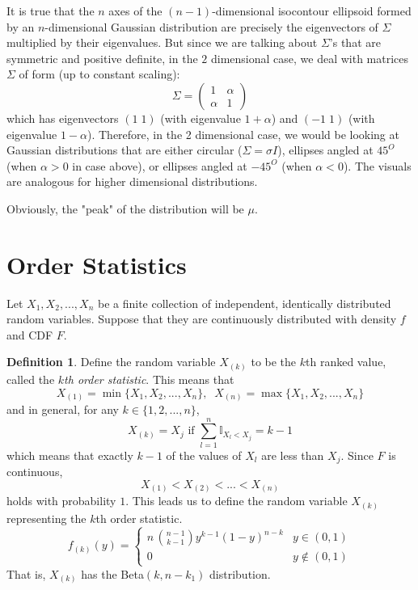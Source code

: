 \documentclass{article}
\theoremstyle{remark}
\theoremstyle{definition}
\newtheorem{definition}{Definition}[section]
\begin{document}
It is true that the $n$ axes of the $(n-1)$-dimensional isocontour ellipsoid formed by an $n$-dimensional Gaussian distribution are precisely the eigenvectors of $\Sigma$ multiplied by their eigenvalues. But since we are talking about $\Sigma$'s that are symmetric and positive definite, in the $2$ dimensional case, we deal with matrices $\Sigma$ of form (up to constant scaling): 
\[\Sigma = \begin{pmatrix}
1 & \alpha \\ \alpha & 1
\end{pmatrix}\]
which has eigenvectors $(1\; 1)$ (with eigenvalue $1+\alpha$) and $(-1\;1)$ (with eigenvalue $1-\alpha$). Therefore, in the 2 dimensional case, we would be looking at Gaussian distributions that are either circular ($\Sigma = \sigma I$), ellipses angled at $45^O$ (when $\alpha > 0$ in case above), or ellipses angled at $-45^O$ (when $\alpha < 0$). The visuals are analogous for higher dimensional distributions. 

Obviously, the "peak" of the distribution will be $\mu$. 

\section{Order Statistics}
Let $X_1, X_2, ..., X_n$ be a finite collection of independent, identically distributed random variables. Suppose that they are continuously distributed with density $f$ and CDF $F$. 

\begin{definition}
Define the random variable $X_{(k)}$ to be the $k$th ranked value, called the \textit{$k$th order statistic}. This means that 
\[X_{(1)} = \min\{X_1, X_2, ..., X_n\}, \;\; X_{(n)} = \max\{X_1, X_2, ..., X_n\}\]
and in general, for any $k \in \{1, 2, ..., n\}$, 
\[X_{(k)} = X_j \text{ if } \sum_{l=1}^n \mathbb{I}_{X_l < X_j} = k - 1\]
which means that exactly $k-1$ of the values of $X_l$ are less than $X_j$. Since $F$ is continuous, 
\[X_{(1)} < X_{(2)} < ... < X_{(n)}\]
holds with probability $1$. This leads us to define the random variable $X_{(k)}$ representing the $k$th order statistic.
\[f_{(k)} (y) = \begin{cases} 
n \, {{n-1} \choose {k-1}} y^{k-1} (1-y)^{n-k} & y \in (0, 1) \\
0 & y \not\in (0,1)
\end{cases}\]
That is, $X_{(k)}$ has the Beta$(k, n-k_1)$ distribution. 
\end{definition}
\end{document}
